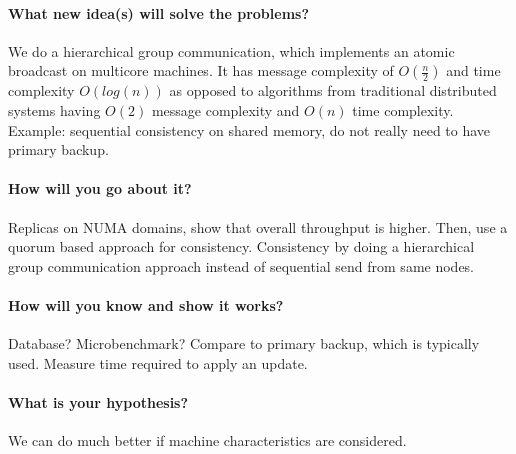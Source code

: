 \documentclass{article}
\begin{document}
\paragraph{What new idea(s) will solve the problems?} We do a
hierarchical group communication, which implements an atomic
broadcast on multicore machines. It has message complexity of
$O(\frac{n}{2})$ and time complexity $O(log(n))$ as opposed to
algorithms from traditional distributed systems having $O(2)$ message
complexity and $O(n)$ time complexity. %
\\
{\footnotesize Example: sequential consistency on shared memory, do
  not really need to have primary backup.}

\paragraph{How will you go about it?} Replicas on NUMA domains, show
that overall throughput is higher. Then, use a quorum based approach for
consistency. Consistency by doing a hierarchical group communication
approach instead of sequential send from same nodes.

\paragraph{How will you know and show it works?} Database?
Microbenchmark? Compare to primary backup, which is typically
used. Measure time required to apply an update.

\paragraph{What is your hypothesis?} We can do much better if machine
characteristics are considered.


\newpage



\label{LastPage}
\end{document}
